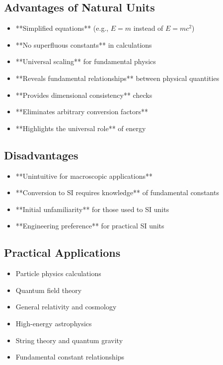 \documentclass[11pt,a4paper]{article}
\begin{document}
	\subsection{Advantages of Natural Units}
	\begin{itemize}
		\item **Simplified equations** (e.g., $E = m$ instead of $E = mc^2$)
		\item **No superfluous constants** in calculations
		\item **Universal scaling** for fundamental physics
		\item **Reveals fundamental relationships** between physical quantities
		\item **Provides dimensional consistency** checks
		\item **Eliminates arbitrary conversion factors**
		\item **Highlights the universal role** of energy
	\end{itemize}
	
	\subsection{Disadvantages}
	\begin{itemize}
		\item **Unintuitive for macroscopic applications**
		\item **Conversion to SI requires knowledge** of fundamental constants
		\item **Initial unfamiliarity** for those used to SI units
		\item **Engineering preference** for practical SI units
	\end{itemize}
	
	\subsection{Practical Applications}
	\begin{itemize}
		\item Particle physics calculations
		\item Quantum field theory
		\item General relativity and cosmology
		\item High-energy astrophysics
		\item String theory and quantum gravity
		\item Fundamental constant relationships
	\end{itemize}
	
\end{document}
